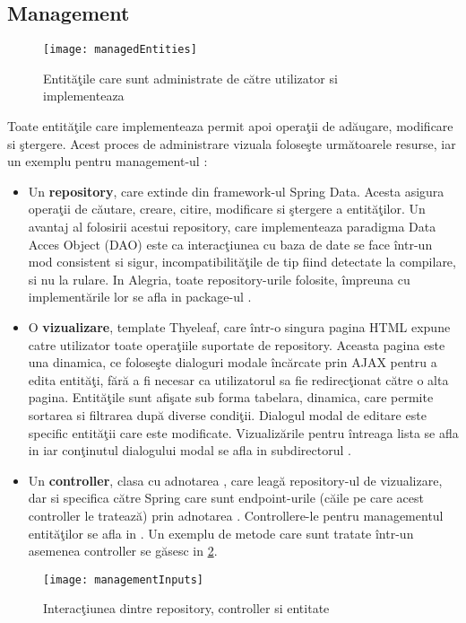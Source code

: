 \subsection{Management}
\begin{figure}[H]
	\centering
	\texttt{[image: managedEntities]}
	\captionsetup{justification=centering}
	\caption{Entităţile care sunt administrate de către utilizator si implementeaza }
	\label{fig:managedEntities}
\end{figure}
Toate entităţile care implementeaza  permit apoi operaţii de adăugare, modificare si ştergere. Acest proces de administrare vizuala foloseşte următoarele resurse, iar un exemplu pentru management-ul :
\begin{itemize}
	\item Un \textbf{repository}, care extinde  din framework-ul Spring Data. Acesta asigura operaţii de căutare, creare, citire, modificare si ştergere a entităţilor. Un avantaj al folosirii  acestui repository, care implementeaza paradigma Data Acces Object (DAO) este ca interacţiunea cu baza de date se face într-un mod consistent si sigur, incompatibilităţile de tip fiind detectate la compilare, si nu la rulare. In Alegria, toate repository-urile folosite, împreuna cu implementările lor se afla in package-ul .
	\item O \textbf{vizualizare}, template Thyeleaf, care într-o singura pagina HTML expune catre utilizator toate operaţiile suportate de repository. Aceasta pagina este una dinamica, ce foloseşte dialoguri modale încărcate prin AJAX pentru a edita entităţi, fără a fi necesar ca utilizatorul sa fie redirecţionat către o alta pagina. Entităţile sunt afişate sub forma tabelara, dinamica, care permite sortarea si filtrarea după diverse condiţii. Dialogul modal de editare este specific entităţii care este modificate. Vizualizările pentru întreaga lista se afla in  iar conţinutul dialogului modal se afla in subdirectorul .
	\item Un \textbf{controller}, clasa cu adnotarea , care leagă repository-ul de vizualizare, dar si specifica către Spring care sunt endpoint-urile (căile pe care acest controller le tratează) prin adnotarea . Controllere-le pentru managementul entităţilor se afla in . Un exemplu de metode care sunt tratate într-un asemenea controller se găsesc in \cref{fig:managementInputs}.
\end{itemize}
\begin{figure}[H]
	\centering
	\captionsetup{justification=centering}
	\texttt{[image: managementInputs]}
	\caption{Interacţiunea dintre repository, controller si entitate}
	\label{fig:managementInputs}
\end{figure}

